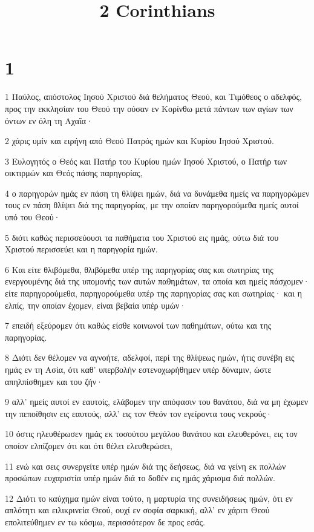 

\title{2 Corinthians}


\chapter{1}

\par 1 Παύλος, απόστολος Ιησού Χριστού διά θελήματος Θεού, και Τιμόθεος ο αδελφός, προς την εκκλησίαν του Θεού την ούσαν εν Κορίνθω μετά πάντων των αγίων των όντων εν όλη τη Αχαΐα·
\par 2 χάρις υμίν και ειρήνη από Θεού Πατρός ημών και Κυρίου Ιησού Χριστού.
\par 3 Ευλογητός ο Θεός και Πατήρ του Κυρίου ημών Ιησού Χριστού, ο Πατήρ των οικτιρμών και Θεός πάσης παρηγορίας,
\par 4 ο παρηγορών ημάς εν πάση τη θλίψει ημών, διά να δυνάμεθα ημείς να παρηγορώμεν τους εν πάση θλίψει διά της παρηγορίας, με την οποίαν παρηγορούμεθα ημείς αυτοί υπό του Θεού·
\par 5 διότι καθώς περισσεύουσι τα παθήματα του Χριστού εις ημάς, ούτω διά του Χριστού περισσεύει και η παρηγορία ημών.
\par 6 Και είτε θλιβόμεθα, θλιβόμεθα υπέρ της παρηγορίας σας και σωτηρίας της ενεργουμένης διά της υπομονής των αυτών παθημάτων, τα οποία και ημείς πάσχομεν· είτε παρηγορούμεθα, παρηγορούμεθα υπέρ της παρηγορίας σας και σωτηρίας· και η ελπίς, την οποίαν έχομεν, είναι βεβαία υπέρ υμών·
\par 7 επειδή εξεύρομεν ότι καθώς είσθε κοινωνοί των παθημάτων, ούτω και της παρηγορίας.
\par 8 Διότι δεν θέλομεν να αγνοήτε, αδελφοί, περί της θλίψεως ημών, ήτις συνέβη εις ημάς εν τη Ασία, ότι καθ' υπερβολήν εστενοχωρήθημεν υπέρ δύναμιν, ώστε απηλπίσθημεν και του ζήν·
\par 9 αλλ' ημείς αυτοί εν εαυτοίς, ελάβομεν την απόφασιν του θανάτου, διά να μη έχωμεν την πεποίθησιν εις εαυτούς, αλλ' εις τον Θεόν τον εγείροντα τους νεκρούς·
\par 10 όστις ηλευθέρωσεν ημάς εκ τοσούτου μεγάλου θανάτου και ελευθερόνει, εις τον οποίον ελπίζομεν ότι και ότι θέλει ελευθερώσει,
\par 11 ενώ και σεις συνεργείτε υπέρ ημών διά της δεήσεως, διά να γείνη εκ πολλών προσώπων ευχαριστία υπέρ ημών διά το δοθέν εις ημάς χάρισμα διά πολλών.
\par 12 Διότι το καύχημα ημών είναι τούτο, η μαρτυρία της συνειδήσεως ημών, ότι εν απλότητι και ειλικρινεία Θεού, ουχί εν σοφία σαρκική, αλλ' εν χάριτι Θεού επολιτεύθημεν εν τω κόσμω, περισσότερον δε προς εσάς.

